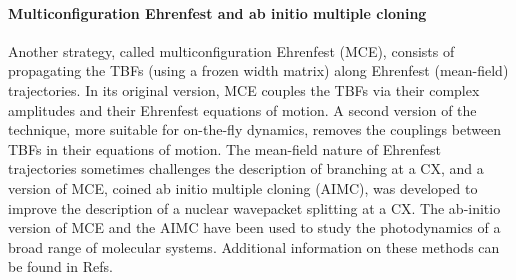 \documentclass[9pt,bestpractices,pubversion]{livecoms}
\begin{document}
\paragraph{Multiconfiguration Ehrenfest and ab initio multiple cloning}
Another strategy, called multiconfiguration Ehrenfest (MCE), consists of propagating the TBFs (using a frozen width matrix) along Ehrenfest (mean-field) trajectories.\cite{shalashilin2009quantum,shalashilin2010nonadiabatic,saita2012fly} In its original version, MCE couples the TBFs via their complex amplitudes and their Ehrenfest equations of motion. A second version of the technique, more suitable for on-the-fly dynamics, removes the couplings between TBFs in their equations of motion.\cite{SHALASHILIN2024212} The mean-field nature of Ehrenfest trajectories sometimes challenges the description of branching at a CX, and a version of MCE, coined ab initio multiple cloning (AIMC), was developed to improve the description of a nuclear wavepacket splitting at a CX.\cite{makhov2014ab} The ab-initio version of MCE and the AIMC have been used to study the photodynamics of a broad range of molecular systems.\cite{doi:10.1021/acs.jctc.3c00583,Makhov_2022,doi:10.1021/acs.jpclett.1c00266,C8CP06359A,C9CP00039A} Additional information on these methods can be found in Refs.~
\end{document}
